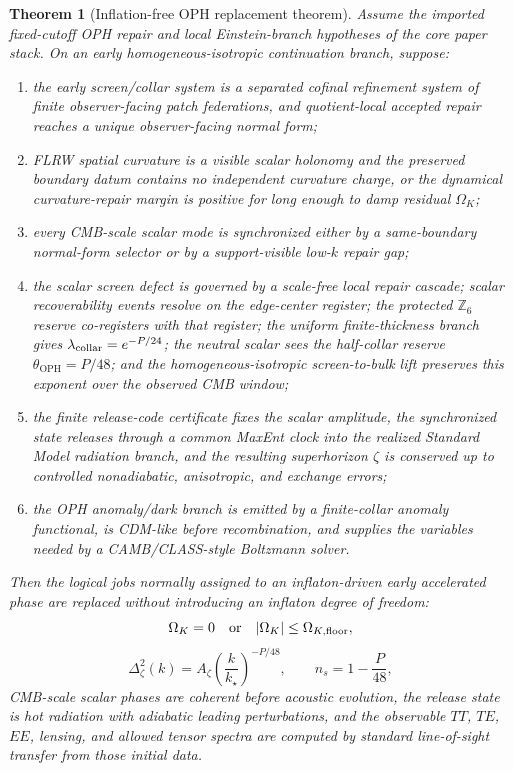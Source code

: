 \documentclass[11pt]{article}
\newtheorem{theorem}{Theorem}[section]
\newcommand{\OPH}{\mathrm{OPH}}
\newcommand{\Zsix}{\mathbb Z_6}
\begin{document}
\begin{theorem}[Inflation-free OPH replacement theorem]\label{thm:oph-inflation-free}
Assume the imported fixed-cutoff OPH repair and local Einstein-branch hypotheses of the core paper
stack. On an early homogeneous-isotropic continuation branch, suppose:
\begin{enumerate}[leftmargin=2em,label=(\roman*)]
\item the early screen/collar system is a separated cofinal refinement system of finite
observer-facing patch federations, and quotient-local accepted repair reaches a unique
observer-facing normal form;
\item FLRW spatial curvature is a visible scalar holonomy and the preserved boundary datum contains
no independent curvature charge, or the dynamical curvature-repair margin is positive for long enough
to damp residual \(\Omega_K\);
\item every CMB-scale scalar mode is synchronized either by a same-boundary normal-form selector or by
a support-visible low-\(k\) repair gap;
\item the scalar screen defect is governed by a scale-free local repair cascade; scalar
recoverability events resolve on the edge-center register; the protected \(\Zsix\) reserve
co-registers with that register; the uniform finite-thickness branch gives
\(\lambda_{\rm collar}=e^{-P/24}\); the neutral scalar sees the half-collar reserve
\(\theta_{\OPH}=P/48\); and the homogeneous-isotropic screen-to-bulk lift preserves this exponent
over the observed CMB window;
\item the finite release-code certificate fixes the scalar amplitude, the synchronized state releases
through a common MaxEnt clock into the realized Standard Model radiation branch, and the resulting
superhorizon \(\zeta\) is conserved up to controlled nonadiabatic, anisotropic, and exchange errors;
\item the OPH anomaly/dark branch is emitted by a finite-collar anomaly functional, is CDM-like
before recombination, and supplies the variables needed by a CAMB/CLASS-style Boltzmann solver.
\end{enumerate}
Then the logical jobs normally assigned to an inflaton-driven early accelerated phase are replaced
without introducing an inflaton degree of freedom:
\[
\Omega_K=0
\quad\hbox{or}\quad
|\Omega_K|\le\Omega_{K,\rm floor},
\]
\[
\Delta_\zeta^2(k)
=
A_\zeta\left(\frac{k}{k_\star}\right)^{-P/48},
\qquad
n_s=1-\frac{P}{48},
\]
CMB-scale scalar phases are coherent before acoustic evolution, the release state is hot radiation
with adiabatic leading perturbations, and the observable \(TT\), \(TE\), \(EE\), lensing, and allowed
tensor spectra are computed by standard line-of-sight transfer from those initial data.
\end{theorem}
\end{document}

